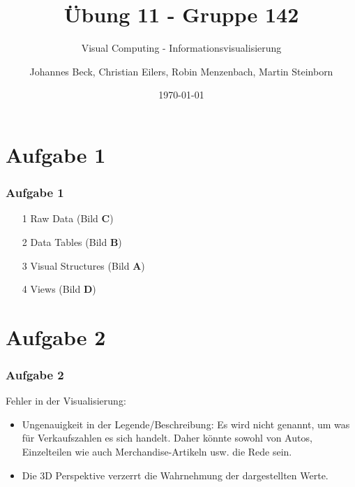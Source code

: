 \documentclass[accentcolor=tud9c,colorbacktitle,inverttitle,landscape,german,presentation,t]{tudbeamer}
\begin{document}
\title{\"Ubung 11 - Gruppe 142}
\subtitle{Visual Computing - Informationsvisualisierung}


\author[Johannes Beck, Christian Eilers, Robin Menzenbach, Martin Steinborn]{Johannes Beck, Christian Eilers, Robin Menzenbach, Martin Steinborn}


\date{\today}

\begin{titleframe}
\end{titleframe}

\section{Aufgabe 1}
	\begin{frame}
		\frametitle{Aufgabe 1}
		\begin{itemize}
			\item[1] Raw Data (Bild \textbf{C})
			\item[2] Data Tables (Bild \textbf{B})
			\item[3] Visual Structures (Bild \textbf{A})
			\item[4] Views (Bild \textbf{D})
		\end{itemize}
	\end{frame}
\section{Aufgabe 2}
\begin{frame}
	\frametitle{Aufgabe 2}
	Fehler in der Visualisierung:
	\begin{itemize}
	\item Ungenauigkeit in der Legende/Beschreibung: Es wird nicht genannt, um was für Verkaufszahlen es sich handelt. Daher könnte sowohl von Autos, Einzelteilen wie auch Merchandise-Artikeln usw. die Rede sein.
	\item Die 3D Perspektive verzerrt die Wahrnehmung der dargestellten Werte.
	\end{itemize}
\end{frame}
\end{document}
